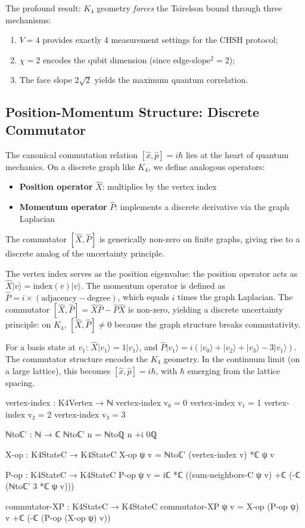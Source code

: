 \documentclass[11pt,a4paper]{book}
\begin{document}
The profound result: $K_4$ geometry \emph{forces} the Tsirelson bound through three mechanisms:
\begin{enumerate}
\item $V = 4$ provides exactly 4 measurement settings for the CHSH protocol;
\item $\chi = 2$ encodes the qubit dimension (since edge-slope$^2 = 2$);
\item The face slope $2\sqrt{2}$ yields the maximum quantum correlation.
\end{enumerate}

\subsection{Position-Momentum Structure: Discrete Commutator}

The canonical commutation relation $[\hat{x},\hat{p}] = i\hbar$ lies at the heart of 
quantum mechanics. On a discrete graph like $K_4$, we define analogous operators:
\begin{itemize}
  \item \textbf{Position operator} $\hat{X}$: multiplies by the vertex index
  \item \textbf{Momentum operator} $\hat{P}$: implements a discrete derivative via the graph Laplacian
\end{itemize}

The commutator $[\hat{X}, \hat{P}]$ is generically non-zero on finite graphs,
giving rise to a discrete analog of the uncertainty principle.

The vertex index serves as the position eigenvalue: the position operator acts as $\hat{X}|v\rangle = \text{index}(v)|v\rangle$. The momentum operator is defined as $\hat{P} = i \times (\text{adjacency} - \text{degree})$, which equals $i$ times the graph Laplacian. The commutator $[\hat{X},\hat{P}] = \hat{X}\hat{P} - \hat{P}\hat{X}$ is non-zero, yielding a discrete uncertainty principle: on $K_4$, $[\hat{X},\hat{P}] \neq 0$ because the graph structure breaks commutativity.

For a basis state at $v_1$: $\hat{X}|v_1\rangle = 1|v_1\rangle$, and $\hat{P}|v_1\rangle = i(|v_0\rangle + |v_2\rangle + |v_3\rangle - 3|v_1\rangle)$. The commutator structure encodes the $K_4$ geometry. In the continuum limit (on a large lattice), this becomes $[\hat{x},\hat{p}] = i\hbar$, with $\hbar$ emerging from the lattice spacing.

\begin{code}
vertex-index : K4Vertex → ℕ
vertex-index v₀ = 0
vertex-index v₁ = 1
vertex-index v₂ = 2
vertex-index v₃ = 3

ℕtoℂ' : ℕ → ℂ
ℕtoℂ' n = ℕtoℚ n +i 0ℚ

X-op : K4StateC → K4StateC
X-op ψ v = ℕtoℂ' (vertex-index v) *ℂ ψ v

P-op : K4StateC → K4StateC
P-op ψ v = iℂ *ℂ ((sum-neighbors-C ψ v) +ℂ (-ℂ (ℕtoℂ' 3 *ℂ ψ v)))

commutator-XP : K4StateC → K4StateC
commutator-XP ψ v = X-op (P-op ψ) v +ℂ (-ℂ (P-op (X-op ψ) v))
\end{code}
\end{document}
